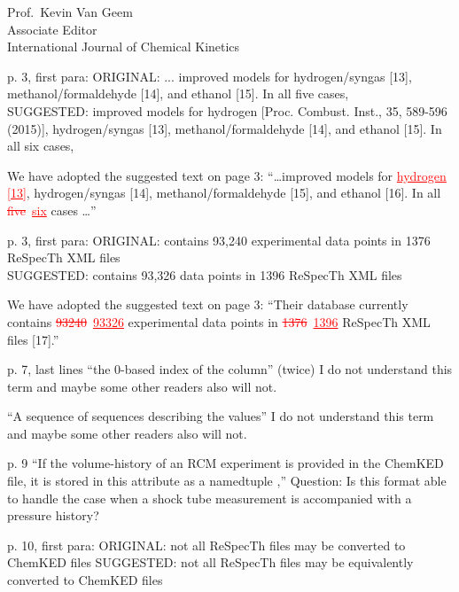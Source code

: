 \documentclass[11pt]{OSUletter}
\newcommand{\addtwo}[1]{{\sloppy\textcolor{red}{\uline{#1}}}}  %
\newcommand{\deletetwo}[1]{\sloppy\textcolor{red}{\sout{#1}}}    %
\begin{document}
\begin{letter}{
               Prof.~Kevin Van Geem\\
               Associate Editor\\
               International Journal of Chemical Kinetics
               }
\begin{quoting}
    p. 3, first para:
    ORIGINAL:
    ... improved models for hydrogen/syngas [13], methanol/formaldehyde [14], and
    ethanol [15]. In all five cases, \\
    SUGGESTED:
    improved models for hydrogen [Proc. Combust. Inst.,  35, 589-596 (2015)],
    hydrogen/syngas [13], methanol/formaldehyde [14], and ethanol [15]. In all six cases,
\end{quoting}

We have adopted the suggested text on page 3:
``\ldots improved models for \addtwo{hydrogen [13]},
hydrogen\slash syngas [14], methanol\slash formaldehyde [15],
and ethanol [16]. In all \deletetwo{five}~\addtwo{six} cases \ldots''


\begin{quoting}
    p. 3, first para:
    ORIGINAL:
    contains 93,240 experimental data points in 1376 ReSpecTh XML files\\
    SUGGESTED:
    contains 93,326 data points in 1396 ReSpecTh XML files
\end{quoting}

We have adopted the suggested text on page 3:
``Their database currently contains \deletetwo{\num{93240}}~\addtwo{\num{93326}}
experimental data points in \deletetwo{1376}~\addtwo{1396}
ReSpecTh XML files [17].''

\begin{quoting}
    p. 7, last lines
    ``the 0-based index of the column'' (twice)
    I do not understand this term and maybe some other readers also will not.
\end{quoting}



\begin{quoting}
    ``A sequence of sequences describing the values''
    I do not understand this term and maybe some other readers also will not.
\end{quoting}



\begin{quoting}
    p. 9
    ``If the volume-history of an RCM experiment is provided in the
    ChemKED file, it is stored in this attribute as a namedtuple ,''
    Question: Is this format able to handle the case when a shock tube measurement
    is accompanied with a pressure history?
\end{quoting}



\begin{quoting}
    p. 10, first para:
    ORIGINAL:
    not all ReSpecTh files may be converted to ChemKED files
    SUGGESTED:
    not all ReSpecTh files may be equivalently converted to ChemKED files
\end{quoting}


\end{letter}
\end{document}

